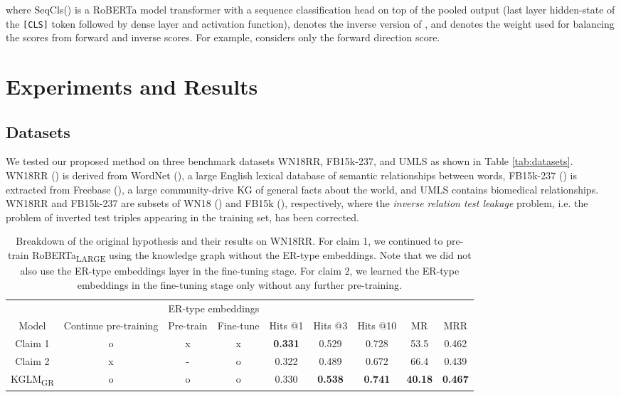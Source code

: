 \documentclass[11pt]{article}
\begin{document}
where SeqCls() is a RoBERTa model transformer with a sequence classification head on top of the pooled output (last layer hidden-state of the \texttt{[CLS]} token followed by dense layer and  activation function),  denotes the inverse version of , and  denotes the weight used for balancing the scores from forward and inverse scores. For example,  considers only the forward direction score.



\section{Experiments and Results}

\subsection{Datasets}
We tested our proposed method on three benchmark datasets WN18RR, FB15k-237, and UMLS as shown in Table \ref{tab:datasets}. WN18RR (\citealp{dettmers2018convolutional}) is derived from WordNet (\citealp{miller1998wordnet}), a large English lexical database of semantic relationships between words, FB15k-237 (\citealp{toutanova2015observed}) is extracted from Freebase (\citealp{bollacker2008freebase}), a large community-drive KG of general facts about the world, and UMLS contains biomedical relationships. WN18RR and FB15k-237 are subsets of WN18 (\citealp{bordes2013translating}) and FB15k (\citealp{bordes2013translating}), respectively, where the \emph{inverse relation test leakage} problem, i.e. the problem of inverted test triples appearing in the training set, has been corrected.

\begin{table*}[ht]
 \caption{Breakdown of the original hypothesis and their results on WN18RR. For claim 1, we continued to pre-train RoBERTa\textsubscript{LARGE} using the knowledge graph without the ER-type embeddings. Note that we did not also use the ER-type embeddings layer in the fine-tuning stage. For claim 2, we learned the ER-type embeddings in the fine-tuning stage only without any further pre-training.}
 \small
  \centering
  \begin{tabular}{ccccccccc}
    \toprule
    \multicolumn{2}{c}{} & \multicolumn{2}{c}{ER-type embeddings} & \multicolumn{5}{c}{} \\
    \cmidrule(r){3-4}
    Model & Continue pre-training & Pre-train & Fine-tune & Hits @1 & Hits @3 & Hits @10 & MR & MRR \\
    \midrule
    Claim 1 & o & x & x & \textbf{0.331} & 0.529 & 0.728 & 53.5 & 0.462 \\
    Claim 2 & x & - & o & 0.322 & 0.489 & 0.672 & 66.4 & 0.439 \\
    KGLM\textsubscript{GR} & o & o & o & 0.330 & \textbf{0.538} & \textbf{0.741} & \textbf{40.18} & \textbf{0.467} \\
    \bottomrule
  \end{tabular}
  \label{tab:breakdown}
\end{table*}
\end{document}
